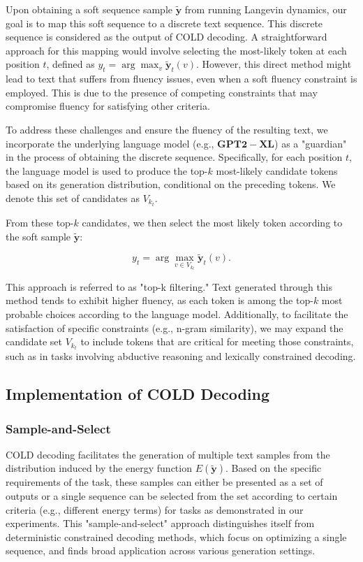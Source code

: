 \documentclass{article}
\begin{document}
Upon obtaining a soft sequence sample \(\mathbf{\tilde{y}}\) from running Langevin dynamics, our goal is to map this soft sequence to a discrete text sequence. This discrete sequence is considered as the output of COLD decoding. A straightforward approach for this mapping would involve selecting the most-likely token at each position \(t\), defined as \(y_t = \arg\max_v \mathbf{\tilde{y}}_t(v)\). However, this direct method might lead to text that suffers from fluency issues, even when a soft fluency constraint is employed. This is due to the presence of competing constraints that may compromise fluency for satisfying other criteria.

To address these challenges and ensure the fluency of the resulting text, we incorporate the underlying language model (e.g., \( \mathbf{GPT2-XL} \)) as a "guardian" in the process of obtaining the discrete sequence. Specifically, for each position \(t\), the language model is used to produce the top-\(k\) most-likely candidate tokens based on its generation distribution, conditional on the preceding tokens. We denote this set of candidates as \(V_{k_t}\).

From these top-\(k\) candidates, we then select the most likely token according to the soft sample \(\mathbf{\tilde{y}}\):

\begin{equation}
    y_t = \arg\max_{v \in V_{k_t}} \mathbf{\tilde{y}}_t(v).
\end{equation}

This approach is referred to as "top-k filtering." Text generated through this method tends to exhibit higher fluency, as each token is among the top-\(k\) most probable choices according to the language model. Additionally, to facilitate the satisfaction of specific constraints (e.g., n-gram similarity), we may expand the candidate set \(V_{k_t}\) to include tokens that are critical for meeting those constraints, such as in tasks involving abductive reasoning and lexically constrained decoding.

\subsection{Implementation of COLD Decoding}

\subsubsection*{Sample-and-Select}
COLD decoding facilitates the generation of multiple text samples from the distribution induced by the energy function \(E(\mathbf{\tilde{y}})\). Based on the specific requirements of the task, these samples can either be presented as a set of outputs or a single sequence can be selected from the set according to certain criteria (e.g., different energy terms) for tasks as demonstrated in our experiments. This "sample-and-select" approach distinguishes itself from deterministic constrained decoding methods, which focus on optimizing a single sequence, and finds broad application across various generation settings.
\end{document}
